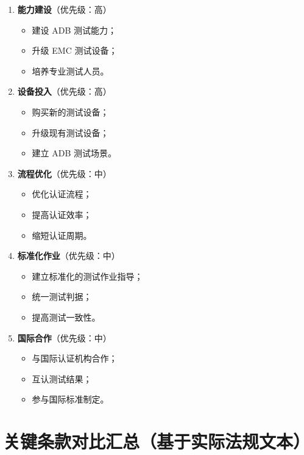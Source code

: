 \begin{enumerate}[leftmargin=2em]
    \item \textbf{能力建设}（优先级：高）
    \begin{itemize}[leftmargin=2em]
        \item 建设 ADB 测试能力；
        \item 升级 EMC 测试设备；
        \item 培养专业测试人员。
    \end{itemize}

    \item \textbf{设备投入}（优先级：高）
    \begin{itemize}[leftmargin=2em]
        \item 购买新的测试设备；
        \item 升级现有测试设备；
        \item 建立 ADB 测试场景。
    \end{itemize}

    \item \textbf{流程优化}（优先级：中）
    \begin{itemize}[leftmargin=2em]
        \item 优化认证流程；
        \item 提高认证效率；
        \item 缩短认证周期。
    \end{itemize}

    \item \textbf{标准化作业}（优先级：中）
    \begin{itemize}[leftmargin=2em]
        \item 建立标准化的测试作业指导；
        \item 统一测试判据；
        \item 提高测试一致性。
    \end{itemize}

    \item \textbf{国际合作}（优先级：中）
    \begin{itemize}[leftmargin=2em]
        \item 与国际认证机构合作；
        \item 互认测试结果；
        \item 参与国际标准制定。
    \end{itemize}
\end{enumerate}

\section{关键条款对比汇总（基于实际法规文本）}

